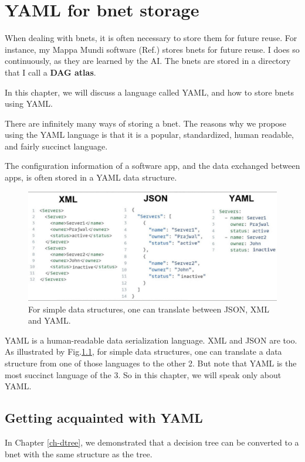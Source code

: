 \chapter{YAML for bnet storage}

When dealing with bnets,
it is often necessary to store
them for future reuse.
 For instance, my Mappa Mundi
software (Ref.\cite{mappa-mundi}) stores
bnets
for future reuse. I does so
continuously, 
as they are learned by the AI. The bnets are stored in a directory that I call a {\bf DAG atlas}.

In this chapter, we will discuss a language called YAML, 
and how to store bnets using YAML.



There are infinitely many ways of storing a bnet. 
The reasons why we propose using the YAML
language is that it is a popular,
standardized,
human readable, and fairly succinct language.

The configuration information of a software app, and the data exchanged between apps,  is often stored in a  YAML data structure.

\begin{figure}[h!]
\centering
\includegraphics[width=6in]
{yaml/json-xml-yaml.jpg}
\caption{For simple data structures,
one can translate between JSON, XML and YAML.}
\label{fig-json-xml-yaml}
\end{figure}

YAML is a human-readable data serialization language.
XML and JSON are too.
As illustrated by Fig.\ref{fig-json-xml-yaml}, for simple data structures, one can translate a data structure
from one of those languages to the other 2. 
But note that
YAML is the most succinct 
language of the 3.
So in this chapter, we will speak only about YAML.

\section{Getting acquainted with YAML}
In Chapter \ref{ch-dtree},
we demonstrated that a decision tree
can be converted to a bnet with the
same structure as the tree.

